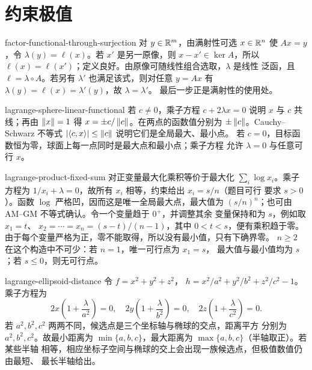 \chapter{约束极值}
\label{chap:constrained-extrema-solutions}

\begin{solution}{factor-functional-through-surjection}
对 $y\in\mathbb{R}^m$，由满射性可选 $x\in\mathbb{R}^n$ 使 $Ax=y$，令
$\lambda(y)=\ell(x)$。若 $x'$ 是另一原像，则 $x-x'\in\ker A$，所以
$\ell(x)=\ell(x')$；定义良好。由原像可随线性组合选取，$\lambda$ 是线性
泛函，且 $\ell=\lambda\circ A$。若另有 $\lambda'$ 也满足该式，则对任意
$y=Ax$ 有 $\lambda(y)=\ell(x)=\lambda'(y)$，故 $\lambda=\lambda'$。
最后一步正是满射性的使用处。
\end{solution}

\begin{solution}{lagrange-sphere-linear-functional}
若 $c\ne0$，乘子方程 $c+2\lambda x=0$ 说明 $x$ 与 $c$ 共线；再由
$\left\lVert x\right\rVert=1$ 得 $x=\pm c/\left\lVert c\right\rVert$。在两点的函数值分别为
$\pm\left\lVert c\right\rVert$。Cauchy--Schwarz 不等式
$|\langle c,x\rangle|\le\left\lVert c\right\rVert$ 说明它们是全局最大、最小点。
若 $c=0$，目标函数恒为零，球面上每一点同时是最大点和最小点；乘子方程
允许 $\lambda=0$ 与任意可行 $x$。
\end{solution}

\begin{solution}{lagrange-product-fixed-sum}
对正变量最大化乘积等价于最大化
$\sum_i\log x_i$。乘子方程为
$1/x_i+\lambda=0$，故所有 $x_i$ 相等，约束给出 $x_i=s/n$（题目可行
要求 $s>0$）。函数 $\log$ 严格凹，因而这是唯一全局最大点，最大值为
$(s/n)^n$；也可由 AM--GM 不等式确认。令一个变量趋于 $0^+$，并调整其余
变量保持和为 $s$，例如取 \(x_1=t\)、
\(x_2=\cdots=x_n=(s-t)/(n-1)\)，其中 \(0<t<s\)，便有乘积趋于零。
由于每个变量严格为正，零不能取得，所以没有最小值，只有下确界零。
\(n\ge2\) 在这个构造中不可少：若 \(n=1\)，唯一可行点为 \(x_1=s\)，
最大值与最小值均为 \(s\)；若 \(s\le0\)，则无可行点。
\end{solution}

\begin{solution}{lagrange-ellipsoid-distance}
令 $f=x^2+y^2+z^2$，
$h=x^2/a^2+y^2/b^2+z^2/c^2-1$。乘子方程为
\[
 2x\left(1+\frac\lambda{a^2}\right)=0,
 \quad
 2y\left(1+\frac\lambda{b^2}\right)=0,
 \quad
 2z\left(1+\frac\lambda{c^2}\right)=0.
\]
若 $a^2,b^2,c^2$ 两两不同，候选点是三个坐标轴与椭球的交点，距离平方
分别为 $a^2,b^2,c^2$。故最小距离为
$\min\{a,b,c\}$，最大距离为 $\max\{a,b,c\}$（半轴取正）。若某些半轴
相等，相应坐标子空间与椭球的交上会出现一族候选点，但极值数值仍由最短、
最长半轴给出。
\end{solution}

